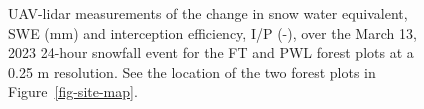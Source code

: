 \documentclass[
  letterpaper,
  DIV=11,
  numbers=noendperiod]{scrartcl}
\begin{document}
\begin{figure}[H]


\caption{\label{fig-lidar-tf-ip}UAV-lidar measurements of the change in
snow water equivalent, SWE (mm) and interception efficiency, I/P (-),
over the March 13, 2023 24-hour snowfall event for the FT and PWL forest
plots at a 0.25 m resolution. See the location of the two forest plots
in Figure~\ref{fig-site-map}.}

\end{figure}%
\end{document}
